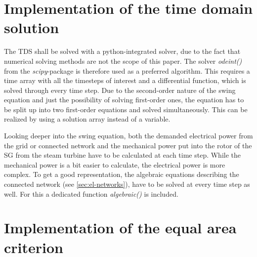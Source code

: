 \section{Implementation of the time domain solution}
\label{sec:tds}

The \acs{TDS} shall be solved with a python-integrated solver, due to the fact that numerical solving methods are not the scope of this paper. The solver {\itshape odeint()} from the {\itshape scipy}-package is therefore used as a preferred algorithm. This requires a time array with all the timesteps of interest and a differential function, which is solved through every time step. Due to the second-order nature of the swing equation and just the possibility of solving first-order ones, the equation has to be split up into two first-order equations and solved simultaneously. This can be realized by using a solution array instead of a variable. 

Looking deeper into the swing equation, both the demanded electrical power from the grid or connected network and the mechanical power put into the rotor of the \acs{SG} from the steam turbine have to be calculated at each time step. While the mechanical power is a bit easier to calculate,
the electrical power is more complex. To get a good representation, the algebraic equations describing the connected network (see \autoref{sec:el-networks}), have to be solved at every time step as well. For this a dedicated function {\itshape algebraic()} is included.

% 

\section{Implementation of the equal area criterion}
\label{sec:eac}



